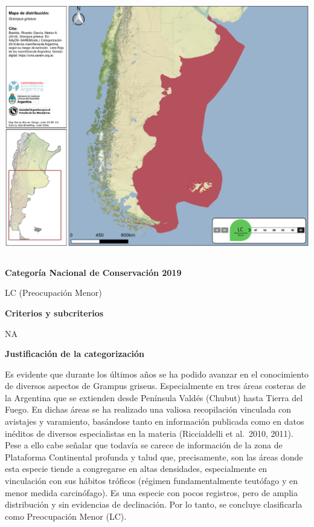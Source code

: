 \documentclass[
  x11names]{article}
\begin{document}
\includegraphics[width=1\linewidth]{maps/Cetartiodactyla/Grampus_griseus}

%
\begin{table}[H]
\centering
\begin{tabular}[t]{>{\raggedright\arraybackslash}m{16cm}>{}m{16cm}}
\toprule
\cellcolor{ceil}{\textcolor{white}{\textbf{\rule{0pt}{14pt}CATEGORÍAS DE CONSERVACIÓN}}}\\
\bottomrule
\end{tabular}
\end{table}

\vspace{-0.4cm}

\textbf{Categoría Nacional de Conservación 2019}

LC (Preocupación Menor)

\textbf{Criterios y subcriterios}

NA

\textbf{Justificación de la categorización}

Es evidente que durante los últimos años se ha podido avanzar en el
conocimiento de diversos aspectos de Grampus griseus. Especialmente en
tres áreas costeras de la Argentina que se extienden desde Península
Valdés (Chubut) hasta Tierra del Fuego. En dichas áreas se ha realizado
una valiosa recopilación vinculada con avistajes y varamiento, basándose
tanto en información publicada como en datos inéditos de diversos
especialistas en la materia (Riccialdelli et al.~2010, 2011). Pese a
ello cabe señalar que todavía se carece de información de la zona de
Plataforma Continental profunda y talud que, precisamente, son las áreas
donde esta especie tiende a congregarse en altas densidades,
especialmente en vinculación con sus hábitos tróficos (régimen
fundamentalmente teutófago y en menor medida carcinófago). Es una
especie con pocos registros, pero de amplia distribución y sin
evidencias de declinación. Por lo tanto, se concluye clasificarla como
Preocupación Menor (LC).
\end{document}
